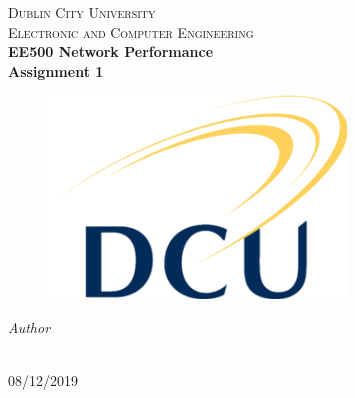 \begin{titlepage}
  \begin{center}

    \textsc{\LARGE Dublin City University}\\[1cm]
    \textsc{\Large Electronic and Computer Engineering}\\[0.5cm]

    {\LARGE \bfseries EE500 Network Performance\\[0.4cm]}
    {\Large \bfseries Assignment 1\\[0.4cm]}

    \begin{figure}[H]
	\includegraphics{images/Dcu-logo.png}
	\centering
    \end{figure}

    \vskip 2cm
    \emph{Author}\\[0.1cm]
    \noindent{}\\[0.1cm]

    \vfill

    {\large{08/12/2019}}

  \end{center}
\end{titlepage}
